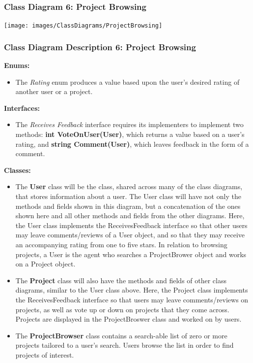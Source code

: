 \documentclass[twoside,letterpaper]{article}
\begin{document}
	\subsubsection[Class Diagram 6: Project Browsing]{\rmfamily\bfseries\color{black}
		Class Diagram 6: Project Browsing}
	\hypertarget{RefHeading22059017292}{}
	\bigskip
	
	\texttt{[image: images/ClassDiagrams/ProjectBrowsing]}
	
	\newpage
	
	\subsubsection[Class Diagram Description 6: Project Browsing]{\rmfamily\bfseries\color{black}
		Class Diagram Description 6: Project Browsing}
	\hypertarget{RefHeading22059017292}{}
	
	
	\textbf{Enums:}\\
	\begin{itemize}
		\item The \textit{Rating} enum produces a value based upon the user's desired rating of another user or a project.
	\end{itemize}
	\textbf{Interfaces:}\\
	\begin{itemize}
		\item The \textit{Receives Feedback} interface requires its implementers to implement two methods: \textbf{int VoteOnUser(User)}, which returns a value based on a user's rating, and \textbf{string Comment(User)}, which leaves feedback in the form of a comment.
	\end{itemize}
	\textbf{Classes:}
	\begin{itemize}
		\item The \textbf{User} class will be the class, shared across many of the class diagrams, that stores information about a user. The User class will have not only the methods and fields shown in this diagram, but a concatenation of the ones shown here and all other methods and fields from the other diagrams. Here, the User class implements the ReceivesFeedback interface so that other users may leave comments/reviews of a User object, and so that they may receive an accompanying rating from one to five stars. In relation to browsing projects, a User is the agent who searches a ProjectBrower object and works on a Project object.
		\item The \textbf{Project} class will also have the methods and fields of other class diagrams, similar to the User class above. Here, the Project class implements the ReceivesFeedback interface so that users may leave comments/reviews on projects, as well as vote up or down on projects that they come across. Projects are displayed in the ProjectBroswer class and worked on by users.
		\item The \textbf{ProjectBrowser} class contains a search-able list of zero or more projects tailored to a user's search. Users browse the list in order to find projects of interest.
	\end{itemize}
	
\end{document}
